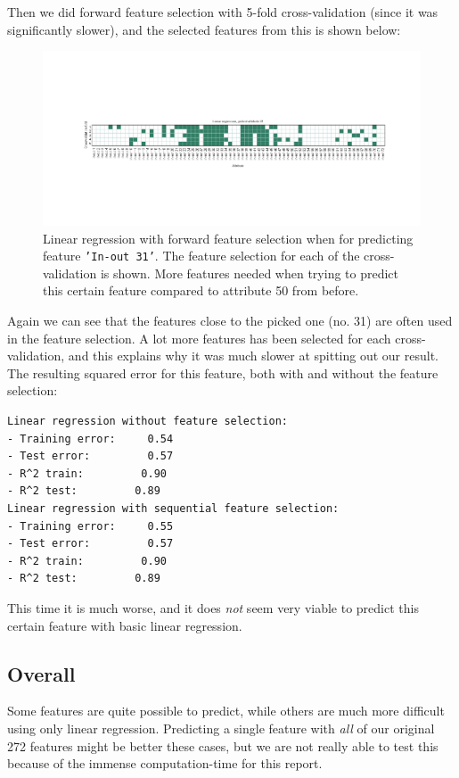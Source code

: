 Then we did forward feature selection with 5-fold cross-validation (since it was significantly slower), and the selected features from this is shown below:

\begin{figure}[H]
\centering
\includegraphics[width=\linewidth, trim= 50mm 50mm 50mm 50mm]{code/linear_regression_attr31}
\caption{Linear regression with forward feature selection when for predicting feature \texttt{'In-out 31'}. The feature selection for each of the cross-validation is shown. More features needed when trying to predict this certain feature compared to attribute 50 from before.}
\label{fig:linforward_attr31}
\end{figure}

Again we can see that the features close to the picked one (no. 31) are often used in the feature selection. A lot more features has been selected for each cross-validation, and this explains why it was much slower at spitting out our result. \\

The resulting squared error for this feature, both with and without the feature selection:

\begin{verbatim}
Linear regression without feature selection:
- Training error:     0.54
- Test error:         0.57
- R^2 train:         0.90
- R^2 test:         0.89
Linear regression with sequential feature selection:
- Training error:     0.55
- Test error:         0.57
- R^2 train:         0.90
- R^2 test:         0.89
\end{verbatim}

This time it is much worse, and it does \emph{not} seem very viable to predict this certain feature with basic linear regression.


\subsection*{Overall}
Some features are quite possible to predict, while others are much more difficult using only linear regression. Predicting a single feature with \emph{all} of our original 272 features might be better these cases, but we are not really able to test this because of the immense computation-time for this report.

